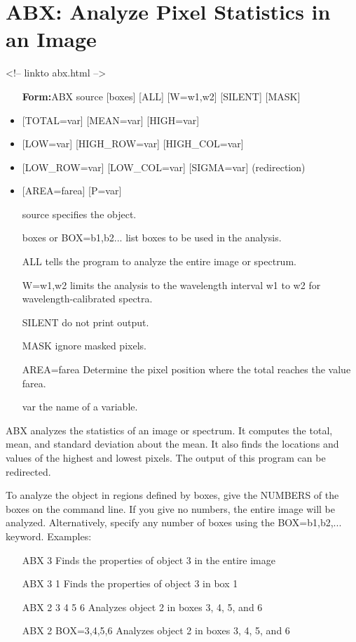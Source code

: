 \section{ABX: Analyze Pixel Statistics in an Image}
\begin{rawhtml}
<!-- linkto abx.html -->
\end{rawhtml}
\begin{itemize}
  \item[\textbf{Form:}ABX source {[boxes]} {[ALL]} {[W=w1,w2]} {[SILENT]} 
       {[MASK]}\hfill]{}
  \item{{[TOTAL=var]} {[MEAN=var]} {[HIGH=var]}}
  \item{{[LOW=var]} {[HIGH\_ROW=var]} {[HIGH\_COL=var]}}
  \item{{[LOW\_ROW=var]} {[LOW\_COL=var]} {[SIGMA=var]} (redirection)}
  \item{{[AREA=farea]} {[P=var]}}
  \item[source]{specifies the object.}
  \item[boxes or BOX=b1,b2...]{list boxes to be used in the analysis.}
  \item[ALL]{tells the program to analyze the entire image or spectrum.}
  \item[W=w1,w2]{limits the analysis to the wavelength interval w1 to w2 for 
       wavelength-calibrated spectra.}
  \item[SILENT]{do not print output.} 
  \item[MASK]{ignore masked pixels.}
  \item[AREA=farea]{Determine the pixel position where the total reaches
       the value farea.}
  \item[var]{the name of a variable.}
\end{itemize}

ABX analyzes the statistics of an image or spectrum.  It computes the total,
mean, and standard deviation about the mean.  It also finds the locations
and values of the highest and lowest pixels.  The output of this program
can be redirected.

To analyze the object in regions defined by boxes, give the NUMBERS of the
boxes on the command line.  If you give no numbers, the entire image will
be analyzed. Alternatively, specify any number of boxes using the
BOX=b1,b2,... keyword. Examples:
\begin{itemize}
  \item[ABX 3\hfill]{Finds the properties of object 3 in the entire image}
  \item[ABX 3 1\hfill]{Finds the properties of object 3 in box 1}
  \item[ABX 2 3 4 5 6\hfill]{Analyzes object 2 in boxes 3, 4, 5, and 6}
  \item[ABX 2 BOX=3,4,5,6 \hfill]{Analyzes object 2 in boxes 3, 4, 5, and 6}
\end{itemize}


